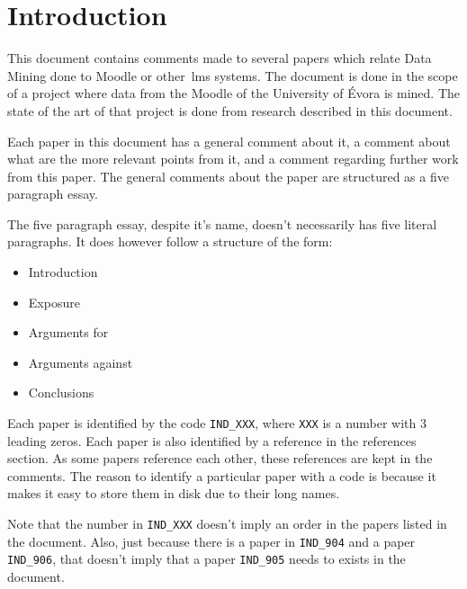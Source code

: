 \chapter{Introduction}

This document contains comments made to several papers which relate Data Mining
done to Moodle or other~\gls{lms} systems. The document is done in the scope of
a project where data from the Moodle of the University of Évora is mined. The
state of the art of that project is done from research described in this
document.

Each paper in this document has a general comment about it, a comment about
what are the more relevant points from it, and a comment regarding further work
from this paper. The general comments about the paper are structured as a five
paragraph essay.

The five paragraph essay, despite it's name, doesn't necessarily has five
literal paragraphs. It does however follow a structure of the form:

\begin{itemize}
    \item Introduction
    \item Exposure
    \item Arguments for
    \item Arguments against
    \item Conclusions
\end{itemize}

Each paper is identified by the code \texttt{IND\_XXX}, where \texttt{XXX} is a
number with 3 leading zeros. Each paper is also identified by a reference in
the references section. As some papers reference each other, these references
are kept in the comments. The reason to identify a particular paper with a code
is because it makes it easy to store them in disk due to their long names.

Note that the number in \texttt{IND\_XXX} doesn't imply an order in the papers
listed in the document. Also, just because there is a paper in
\texttt{IND\_904} and a paper \texttt{IND\_906}, that doesn't imply that a
paper \texttt{IND\_905} needs to exists in the document.
